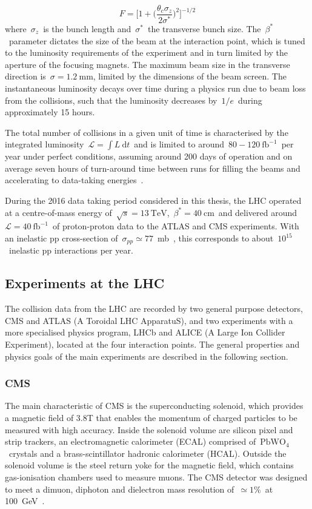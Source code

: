 \begin{equation}
F = \biggl[1 + \bigr( \frac{\theta_c \sigma_z}{2 \sigma^*} \bigr)^2 \biggr]^{-1/2}
\end{equation}
where~$\sigma_z$~is the bunch length and~$\sigma^*$~the transverse bunch size. The~$\beta^*$~parameter dictates the size of the beam at the interaction point, which is tuned to the luminosity requirements of the experiment and in turn limited by the aperture of the focusing magnets. The maximum beam size in the transverse direction is~$\sigma=1.2~\mathrm{mm}$, limited by the dimensions of the beam screen. The instantaneous luminosity decays over time during a physics run due to beam loss from the collisions, such that the luminosity decreases by~$1/e$~during approximately 15 hours.

The total number of collisions in a given unit of time is characterised by the integrated luminosity~$\mathcal{L} = \int L\ \mathrm{d}t$~and is limited to around~$80-120~\mathrm{fb}^{-1}$~per year under perfect conditions, assuming around 200 days of operation and on average seven hours of turn-around time between runs for filling the beams and accelerating to data-taking energies~\cite{Evans:2008zzb}.

During the 2016 data taking period considered in this thesis, the LHC operated at a centre-of-mass energy of~$\sqrt{s} = 13~\mathrm{TeV}$,~$\beta^* = 40~\mathrm{cm}$~and delivered around~$\mathcal{L} = 40~\mathrm{fb}^{-1}$~of proton-proton data to the ATLAS and CMS experiments. With an inelastic pp cross-section of~$\sigma_{pp} \simeq 77$~mb~\cite{VanHaevermaet:2016gnh}, this corresponds to about~$10^{15}$~inelastic pp interactions per year.

\subsection{Experiments at the LHC}
The collision data from the LHC are recorded by two general purpose detectors, CMS and ATLAS (A Toroidal LHC ApparatuS), and two experiments with a more specialised physics program, LHCb and ALICE (A Large Ion Collider Experiment), located at the four interaction points. The general properties and physics goals of the main experiments are described in the following section.

\subsubsection{CMS}
The main characteristic of CMS is the superconducting solenoid, which provides a magnetic field of 3.8T that enables the momentum of charged particles to be measured with high accuracy. Inside the solenoid volume are silicon pixel and strip trackers, an electromagnetic calorimeter (ECAL) comprised of~$\mathrm{PbWO}_4$~crystals and a brass-scintillator hadronic calorimeter (HCAL). Outside the solenoid volume is the steel return yoke for the magnetic field, which contains gas-ionisation chambers used to measure muons. The CMS detector was designed to meet a dimuon, diphoton and dielectron mass resolution of~$\simeq1\%$~at 100~GeV~\cite{Chatrchyan:2008aa}.

